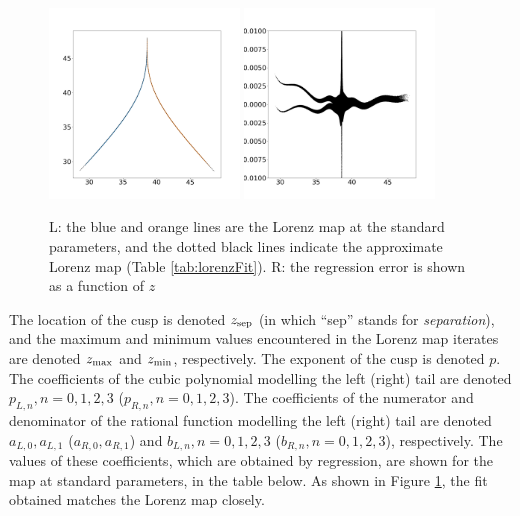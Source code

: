 \begin{figure}
		\includegraphics[width=0.45\textwidth]{lorenz_map_fit_lorenz_zmax_10_28_2.6666666666666665.npy.png}
		\includegraphics[width=0.45\textwidth]{lorenz_map_fit_error_lorenz_zmax_10_28_2.6666666666666665.npy.png}
		\caption{L: the blue and orange lines are the Lorenz map at the standard parameters, and the dotted black lines indicate the approximate Lorenz map (Table \ref{tab:lorenzFit}). R: the regression error is shown as a function of $z$} 
	\label{fig:lorenzMapComp}
\end{figure}
The location of the cusp is denoted $z_{\rm sep}$ (in which ``sep'' stands 
for \emph{separation}), and the maximum and minimum values encountered 
in the Lorenz map iterates are denoted $z_{\rm max}$ and $z_{\rm min}$, respectively. The exponent of the cusp is denoted $p$. The coefficients of the cubic polynomial modelling the left (right) tail are  denoted $p_{L,n}, n = 0,1,2,3$ ($p_{R,n}, n = 0,1,2,3$). The coefficients of the numerator and denominator of the rational function modelling the left (right) tail are denoted $a_{L,0}, a_{L,1}$ ($a_{R,0}, a_{R,1}$) and $b_{L,n}, n=0,1,2,3$ ($b_{R,n}, n=0,1,2,3$), respectively. The values of these coefficients, which are obtained by
regression, are shown for the map at standard parameters, in the table below. As shown in Figure \ref{fig:lorenzMapComp}, the fit obtained matches the Lorenz map closely.
